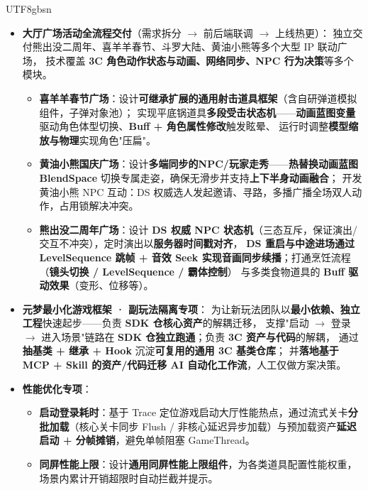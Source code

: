 \documentclass[a4paper, 10.5pt]{article}
\begin{document}
\begin{CJK}{UTF8}{gbsn}
\begin{itemize}
  \item \textbf{大厅广场活动全流程交付}（需求拆分 $\rightarrow$ 前后端联调 $\rightarrow$ 上线热更）：
        独立交付熊出没二周年、喜羊羊春节、斗罗大陆、黄油小熊等多个大型 IP 联动广场，
        技术覆盖 \textbf{3C 角色动作状态与动画、网络同步、NPC 行为决策}等多个模块。
        \begin{itemize}[leftmargin=1.4em, topsep=1pt, label=$\circ$]
          \item \textbf{喜羊羊春节广场}：设计\textbf{可继承扩展的通用射击道具框架}（含自研弹道模拟组件，子弹对象池）；
                实现平底锅道具\textbf{多段受击状态机}——\textbf{动画蓝图变量}驱动角色体型切换、\textbf{Buff + 角色属性修改}触发眩晕、
                运行时调整\textbf{模型缩放与物理}实现角色"压扁"。
          \item \textbf{黄油小熊国庆广场}：设计\textbf{多端同步的NPC/玩家走秀}——\textbf{热替换动画蓝图 BlendSpace} 切换专属走姿，确保无滑步并支持\textbf{上下半身动画融合}；
                开发黄油小熊 NPC 互动：DS 权威选人发起邀请、寻路，多播广播全场双人动作，占用锁解决冲突。
          \item \textbf{熊出没二周年广场}：设计 \textbf{DS 权威 NPC 状态机}（三态互斥，保证演出/交互不冲突），定时演出以\textbf{服务器时间戳对齐}，
          \textbf{DS 重启与中途进场通过 LevelSequence 跳帧 + 音效 Seek 实现音画同步续播}；打通烹饪流程（\textbf{镜头切换 / LevelSequence / 霸体控制}）
          与多类食物道具的 \textbf{Buff 驱动效果}（变形、位移等）。
        \end{itemize}

  \item \textbf{元梦最小化游戏框架 · 副玩法隔离专项}：
        为让新玩法团队以\textbf{最小依赖、独立工程}快速起步——负责 \textbf{SDK 仓核心资产}的解耦迁移，
        支撑"启动 $\rightarrow$ 登录 $\rightarrow$ 进入场景"链路在 \textbf{SDK 仓独立跑通}；负责 \textbf{3C 资产与代码}的解耦，
        通过\textbf{抽基类 + 继承 + Hook} 沉淀\textbf{可复用的通用 3C 基类仓库}；
        并\textbf{落地基于 MCP + Skill 的资产/代码迁移 AI 自动化工作流}，人工仅做方案决策。

  \item \textbf{性能优化专项}：
        \begin{itemize}[leftmargin=1.4em, topsep=1pt, label=$\circ$]
          \item \textbf{启动登录耗时}：基于 Trace 定位游戏启动大厅性能热点，通过流式关卡\textbf{分批加载}（核心关卡同步 Flush / 非核心延迟异步加载）与预加载资产\textbf{延迟启动 + 分帧摊销}，避免单帧阻塞 GameThread。
          \item \textbf{同屏性能上限}：设计\textbf{通用同屏性能上限组件}，为各类道具配置性能权重，场景内累计开销超限时自动拦截并提示。
        \end{itemize}


\end{itemize}
\end{CJK}
\end{document}
